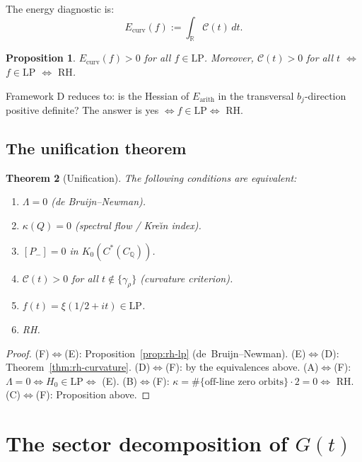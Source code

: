 \documentclass[11pt]{amsart}
\newtheorem{theorem}{Theorem}[section]
\newtheorem{proposition}[theorem]{Proposition}
\newcommand{\LP}{\mathrm{LP}}
\begin{document}
The energy diagnostic is:
\[
  E_{\mathrm{curv}}(f) := \int_\mathbb{R} \mathcal{C}(t)\,dt.
\]

\begin{proposition}
$E_{\mathrm{curv}}(f) > 0$ for all $f \in \LP$.
Moreover, $\mathcal{C}(t) > 0$ for all $t$ $\iff$ $f \in \LP$ $\iff$ $\mathrm{RH}$.
\end{proposition}

Framework D reduces to: is the Hessian of $E_\mathrm{arith}$ in the transversal $b_j$-direction
positive definite?  The answer is yes $\iff f \in \LP \iff$ RH.

\subsection{The unification theorem}

\begin{theorem}[Unification]\label{thm:lp}
The following conditions are equivalent:
\begin{enumerate}
  \item[\rm(A)] $\Lambda = 0$ (de Bruijn--Newman).
  \item[\rm(B)] $\kappa(Q) = 0$ (spectral flow / Kre\u{\i}n index).
  \item[\rm(C)] $[P_-] = 0$ in $K_0(C^*(C_\mathbb{Q}))$.
  \item[\rm(D)] $\mathcal{C}(t) > 0$ for all $t \notin \{\gamma_\rho\}$ (curvature criterion).
  \item[\rm(E)] $f(t) = \xi(1/2+it) \in \LP$.
  \item[\rm(F)] RH.
\end{enumerate}
\end{theorem}

\begin{proof}
(F)$\iff$(E): Proposition~\ref{prop:rh-lp} (de~Bruijn--Newman).
(E)$\iff$(D): Theorem~\ref{thm:rh-curvature}.
(D)$\iff$(F): by the equivalences above.
(A)$\iff$(F): $\Lambda = 0 \iff H_0 \in \LP \iff$ (E).
(B)$\iff$(F): $\kappa = \#\{\text{off-line zero orbits}\}\cdot 2 = 0 \iff$ RH.
(C)$\iff$(F): Proposition above.
\end{proof}

\section{The sector decomposition of $G(t)$}
\label{sec:sectors}
\end{document}
